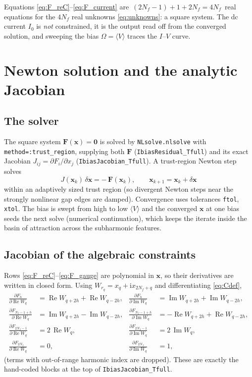 \documentclass[11pt,a4paper]{article}
\newcommand{\ii}{\mathrm{i}}
\newcommand{\Real}{\operatorname{Re}}
\newcommand{\Imag}{\operatorname{Im}}
\begin{document}
Equations \eqref{eq:F_reC}--\eqref{eq:F_current} are $\,(2N_f-1)+1+2N_f=4N_f\,$
real equations for the $4N_f$ real unknowns \eqref{eq:unknowns}: a square system.
The dc current $I_0$ is \emph{not} constrained, it is the output read off from the
converged solution, and sweeping the bias $\Omega=\langle V\rangle$ traces the
$I$--$V$ curve.

\section{Newton solution and the analytic Jacobian}
\label{sec:jacobian}

\subsection{The solver}

The square system $\mathbf F(\mathbf x)=\mathbf 0$ is solved by
\texttt{NLsolve.nlsolve} with \texttt{method=:trust\_region}, supplying both
$\mathbf F$ (\texttt{IbiasResidual\_Tfull}) and its exact Jacobian
$J_{ij}=\partial F_i/\partial x_j$ (\texttt{IbiasJacobian\_Tfull}).  A trust-region Newton
step solves
\begin{equation}
  J(\mathbf x_k)\,\delta\mathbf x = -\,\mathbf F(\mathbf x_k),
  \qquad
  \mathbf x_{k+1} = \mathbf x_k + \delta\mathbf x
\end{equation}
within an adaptively sized trust region (so divergent Newton steps near the
strongly nonlinear gap edges are damped).  Convergence uses tolerances
\texttt{ftol}, \texttt{xtol}.  The bias is swept from high to low
$\langle V\rangle$ and the converged $\mathbf x$ at one bias seeds the next solve
(numerical continuation), which keeps the iterate inside the basin of attraction
across the subharmonic features.

\subsection{Jacobian of the algebraic constraints}

Rows \eqref{eq:F_reC}--\eqref{eq:F_gauge} are polynomial in $\mathbf x$, so their
derivatives are written in closed form. Using $W_{r_q}=x_q+\ii x_{2N_f+q}$ and 
differentiating \eqref{eq:Cdef},
\begin{align}
  \frac{\partial F_h}{\partial \Real W_q} &= \Real W_{q+2h}+\Real W_{q-2h},
  & \frac{\partial F_h}{\partial \Imag W_q} &= \Imag W_{q+2h}+\Imag W_{q-2h},
  \label{eq:jac_reC}\\
  \frac{\partial F_{N_f-1+h}}{\partial \Real W_q} &= \Imag W_{q+2h}-\Imag W_{q-2h},
  & \frac{\partial F_{N_f-1+h}}{\partial \Imag W_q} &= -\Real W_{q+2h}+\Real W_{q-2h},
  \label{eq:jac_imC}\\
  \frac{\partial F_{2N_f-1}}{\partial \Real W_q} &= 2\,\Real W_q,
  & \frac{\partial F_{2N_f-1}}{\partial \Imag W_q} &= 2\,\Imag W_q,
  \label{eq:jac_norm}\\
  \frac{\partial F_{2N_f}}{\partial \Real W_q} &= 0,
  & \frac{\partial F_{2N_f}}{\partial \Imag W_q} &= 1,
  \label{eq:jac_gauge}
\end{align}
(terms with out-of-range harmonic index are dropped).  These are exactly the
hand-coded blocks at the top of \texttt{IbiasJacobian\_Tfull}.
\end{document}
